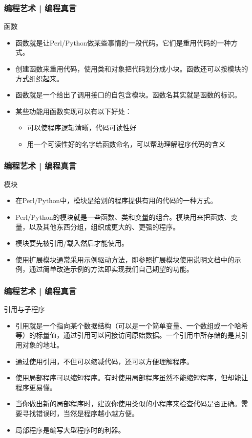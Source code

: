 \begin{frame}
  \frametitle{编程艺术 | 编程真言}
  \begin{block}{函数}
    \begin{itemize}
      \item 函数就是让Perl/Python做某些事情的一段代码。它们是\alert{重用代码}的一种方式。
      \item 创建函数来重用代码，使用类和对象把代码划分成小块。函数还可以按模块的方式组织起来。
      \item 函数就是一个给出了调用接口的自包含模块。函数名其实就是函数的标识。
      \item 某些功能用函数实现可以有以下好处：
        \begin{itemize}
          \item 可以使程序逻辑清晰，代码可读性好
          \item 用一个可读性好的名字给函数命名，可以帮助理解程序代码的含义
        \end{itemize}
    \end{itemize}
  \end{block}
\end{frame}

\begin{frame}
  \frametitle{编程艺术 | 编程真言}
  \begin{block}{模块}
    \begin{itemize}
      \item 在Perl/Python中，模块是给别的程序提供有用的代码的一种方式。
      \item Perl/Python的模块就是一些函数、类和变量的组合。模块用来把函数、变量，以及其他东西分组，组织成更大的、更强的程序。
      \item 模块要先被引用/载入然后才能使用。
      \item 使用扩展模块通常采用\alert{示例驱动方法}，即参照扩展模块使用说明文档中的示例，通过简单改造示例的方法即实现我们自己期望的功能。
    \end{itemize}
  \end{block}
\end{frame}

\begin{frame}
  \frametitle{编程艺术 | 编程真言}
  \begin{block}{引用与子程序}
    \begin{itemize}
      \item 引用就是一个指向某个数据结构（可以是一个简单变量、一个数组或一个哈希等）的标量值，通过引用可以间接访问原始数据。一个引用中所存储的是其引用对象的地址。
      \item 通过使用引用，不但可以缩减代码，还可以方便理解程序。
      \item 使用局部程序可以缩短程序。有时使用局部程序虽然不能缩短程序，但却能让程序更易懂。
      \item 当你做出新的局部程序时，建议你使用类似的小程序来检查代码是否正确。需要寻找错误时，当然是程序越小越方便。
      \item 局部程序是编写大型程序时的利器。
    \end{itemize}
  \end{block}
\end{frame}

